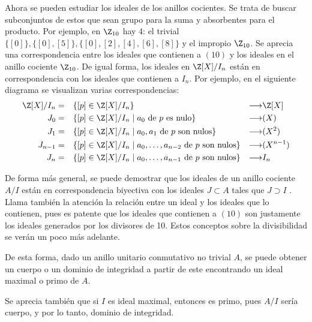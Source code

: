 \begin{TFGampliado}
    \vspace{-1em}
    \item Ahora se pueden estudiar los ideales de los anillos cocientes. Se trata de buscar subconjuntos de estos que sean grupo para la suma y absorbentes para el producto. Por ejemplo, en $\Z_{10}$ hay 4: el trivial $\{[0]\}, \{[0], [5]\}, \{[0], [2], [4], [6], [8]\}$ y el impropio $\Z_{10}$. Se aprecia una correspondencia entre los ideales que contienen a $(10)$ y los ideales en el anillo cociente $\Z_{10}$. De igual forma, los ideales en $\Z[X]/I_n$ están en correspondencia con los ideales que contienen a $I_n$. Por ejemplo, en el siguiente diagrama se visualizan varias correspondencias:
    \begin{align*}
        \Z[X]/I_n = \quad& \{[p] \in \Z[X]/I_n\} &\longrightarrow & \Z[X] \\
        J_0 = \quad&\{[p] \in \Z[X]/I_n \mid a_0 \text{ de } p \text{ es nulo}\} &\longrightarrow & (X)\\
        J_1 = \quad&\{[p] \in \Z[X]/I_n \mid a_0, a_1 \text{ de } p \text{ son nulos}\} &\longrightarrow &(X^2)\\
        J_{n-1} = \quad&\{[p] \in \Z[X]/I_n \mid a_0,\ldots ,a_{n-2} \text{ de } p \text{ son nulos}\}&\longrightarrow &(X^{n-1}) \\
        J_n = \quad&\{[p] \in \Z[X]/I_n \mid a_0,\ldots ,a_{n-1} \text{ de } p \text{ son nulos}\} &\longrightarrow &I_n
    \end{align*}
    \item De forma más general, se puede demostrar que los ideales de un anillo cociente $A/I$ están en correspondencia biyectiva con los ideales $J \subset A$ tales que $J \supset I$ \cite[p.~26]{GamboaAnillos}. Llama también la atención la relación entre un ideal y los ideales que lo contienen, pues es patente que los ideales que contienen a $(10)$ son justamente los ideales generados por los divisores de 10. Estos conceptos sobre la divisibilidad se verán un poco más adelante.
\end{TFGampliado}

\begin{TFGampliado}
    \begin{obs}
        \item De esta forma, dado un anillo unitario conmutativo no trivial $A$, se puede obtener un cuerpo o un dominio de integridad a partir de este encontrando un ideal maximal o primo de $A$.
        \item Se aprecia también que si $I$ es ideal maximal, entonces es primo, pues $A/I$ sería cuerpo, y por lo tanto, dominio de integridad.
    \end{obs}
\end{TFGampliado}    

